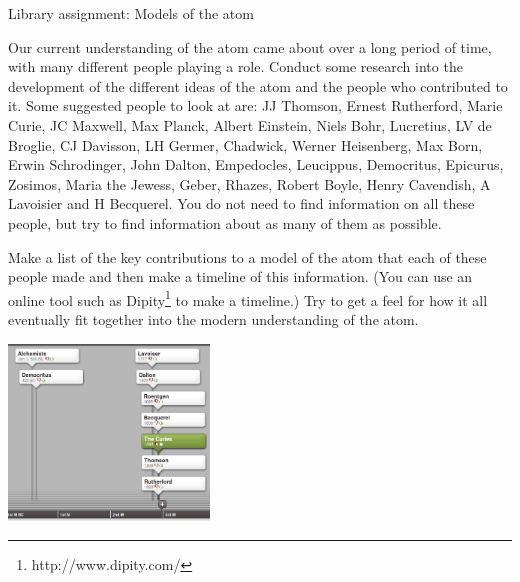             \begin{project}{Library assignment: Models of the atom}
            \nopagebreak
            \label{m38756*eip-3}

Our current understanding of the atom came about over a long period of time, with many different people playing a role. Conduct some research into the development of the different ideas of the atom and the people who contributed to it. Some suggested people to look at are: JJ Thomson, Ernest Rutherford, Marie Curie, JC Maxwell, Max Planck, Albert Einstein, Niels Bohr, Lucretius, LV de Broglie, CJ Davisson, LH Germer, Chadwick, Werner Heisenberg, Max Born, Erwin Schrodinger, John Dalton, Empedocles, Leucippus, Democritus, Epicurus, Zosimos, Maria the Jewess, Geber, Rhazes, Robert Boyle, Henry Cavendish, A Lavoisier and H Becquerel. You do not need to find information on all these people, but try to find information about as many of them as possible.
\par \begin{minipage}{.5\textwidth}
\label{m38756*id7342}Make a list of the key contributions to a model of the atom that each of these people made and then make a timeline of this information. (You can use an online tool such as Dipity\footnote{http://www.dipity.com/}
         to make a timeline.) Try to get a feel for how it all eventually fit together into the modern understanding of the atom. 
\end{minipage}
\begin{minipage}{.5\textwidth}
 \begin{center}
  \includegraphics[width=0.4\textwidth]{photos/timeline_atom.png}
 \end{center}

\end{minipage}

\end{project}
\par \label{m38756*cid2}
